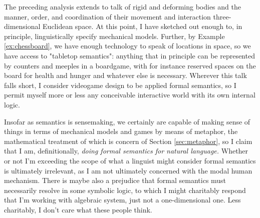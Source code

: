  The preceding analysis extends to talk of rigid and deforming bodies and the manner, order, and coordination of their movement and interaction three-dimensional Euclidean space. At this point, I have sketched out enough to, in principle, linguistically specify mechanical models. Further, by Example \ref{ex:chessboard}, we have enough technology to speak of locations in space, so we have access to "tabletop semantics": anything that in principle can be represented by counters and meeples in a boardgame, with for instance reserved spaces on the board for health and hunger and whatever else is necessary. Wherever this talk falls short, I consider videogame design to be applied formal semantics, so I permit myself more or less any conceivable interactive world with its own internal logic.

 Insofar as semantics is sensemaking, we certainly are capable of making sense of things in terms of mechanical models and games by means of metaphor, the mathematical treatment of which is concern of Section \ref{sec:metaphor}, so I claim that I am, definitionally, \emph{doing formal semantics for natural language.} Whether or not I'm exceeding the scope of what a linguist might consider formal semantics is ultimately irrelevant, as I am not ultimately concerned with the modal human mechanism. There is maybe also a prejudice that formal semantics must necessarily resolve in some symbolic logic, to which I might charitably respond that I'm working with algebraic system, just not a one-dimensional one. Less charitably, I don't care what these people think.